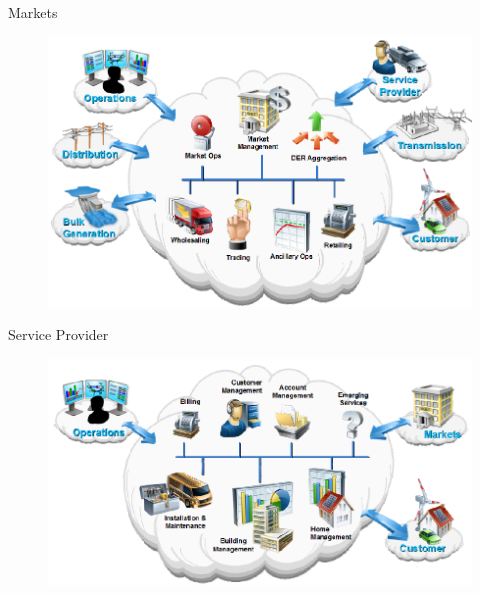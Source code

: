 
\begin{frame}[fragile]{Markets}
	\begin{figure}[h] 
		\includegraphics[scale=0.45]{imgs/market.png}
	\end{figure}
\end{frame}


\begin{frame}[fragile]{Service Provider}
	\begin{figure}[h] 
		\includegraphics[scale=0.45]{imgs/ser.png}
	\end{figure}
\end{frame}

